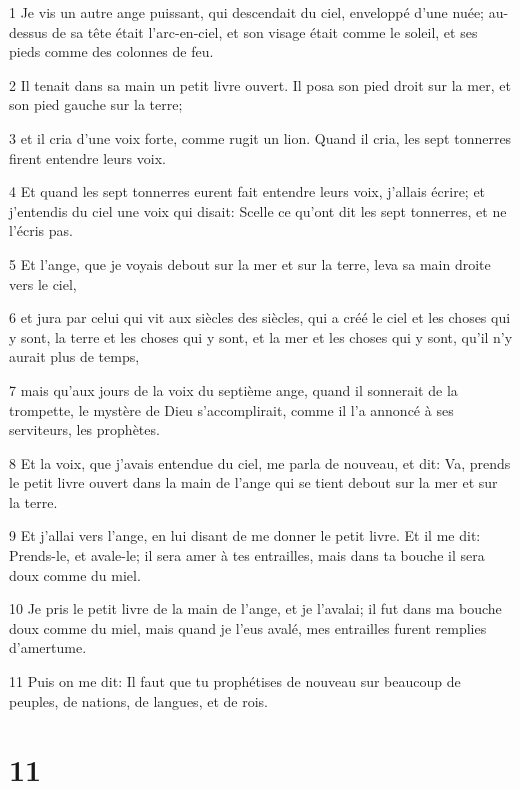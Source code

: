 \par 1 Je vis un autre ange puissant, qui descendait du ciel, enveloppé d'une nuée; au-dessus de sa tête était l'arc-en-ciel, et son visage était comme le soleil, et ses pieds comme des colonnes de feu.
\par 2 Il tenait dans sa main un petit livre ouvert. Il posa son pied droit sur la mer, et son pied gauche sur la terre;
\par 3 et il cria d'une voix forte, comme rugit un lion. Quand il cria, les sept tonnerres firent entendre leurs voix.
\par 4 Et quand les sept tonnerres eurent fait entendre leurs voix, j'allais écrire; et j'entendis du ciel une voix qui disait: Scelle ce qu'ont dit les sept tonnerres, et ne l'écris pas.
\par 5 Et l'ange, que je voyais debout sur la mer et sur la terre, leva sa main droite vers le ciel,
\par 6 et jura par celui qui vit aux siècles des siècles, qui a créé le ciel et les choses qui y sont, la terre et les choses qui y sont, et la mer et les choses qui y sont, qu'il n'y aurait plus de temps,
\par 7 mais qu'aux jours de la voix du septième ange, quand il sonnerait de la trompette, le mystère de Dieu s'accomplirait, comme il l'a annoncé à ses serviteurs, les prophètes.
\par 8 Et la voix, que j'avais entendue du ciel, me parla de nouveau, et dit: Va, prends le petit livre ouvert dans la main de l'ange qui se tient debout sur la mer et sur la terre.
\par 9 Et j'allai vers l'ange, en lui disant de me donner le petit livre. Et il me dit: Prends-le, et avale-le; il sera amer à tes entrailles, mais dans ta bouche il sera doux comme du miel.
\par 10 Je pris le petit livre de la main de l'ange, et je l'avalai; il fut dans ma bouche doux comme du miel, mais quand je l'eus avalé, mes entrailles furent remplies d'amertume.
\par 11 Puis on me dit: Il faut que tu prophétises de nouveau sur beaucoup de peuples, de nations, de langues, et de rois.

\chapter{11}

